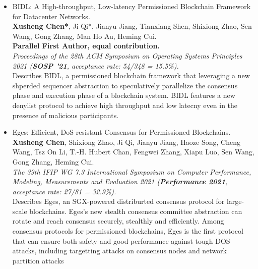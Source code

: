 \documentclass[a4paper,7pt]{article} %
\newcommand{\authors}[1]{{\small \fontfamily{cmss}\selectfont #1}}
\newcommand{\conference}[1]{\textit{\small \fontfamily{cmss}\selectfont #1}}
\newcommand{\info}[1]{{\footnotesize \fontfamily{cmss}\selectfont #1}}
\begin{document}
\begin{itemize}

    \item {BIDL: A High-throughput, Low-latency Permissioned Blockchain Framework for Datacenter Networks.} \\
    \authors{\textbf{Xusheng Chen*}, Ji Qi*, Jianyu Jiang, Tianxiang Shen, Shixiong Zhao, Sen Wang, Gong Zhang, Man Ho Au, Heming Cui.} \\
    \authors{\bf* Parallel First Author, equal contribution.}\\
    \conference{Proceedings of the 28th ACM Symposium on Operating Systems Principles 2021 (\textbf{SOSP '21}, acceptance rate: 54/348 = 15.5\%).} \\
    \info{Describes BIDL, a permissioned blockchain framework that leveraging a new shperded sequencer abstraction to speculatively parallelize the consensus phase and execution phase 
    of a blockchain system. BIDL features a new denylist protocol to achieve high throughput and low latecny even in the presence of 
    malicious participants.}\\

    \item {Eges: Efficient, DoS-resistant Consensus for Permissioned Blockchains.} \\
    \authors{\textbf{Xusheng Chen}, Shixiong Zhao, Ji Qi,  Jianyu Jiang, Haoze Song, Cheng Wang, Tsz On Li, T.-H. Hubert Chan, Fengwei Zhang, Xiapu Luo, Sen Wang, Gong Zhang, Heming Cui.} \\
    \conference{The 39th IFIP WG 7.3 International Symposium on Computer Performance, Modeling, Measurements and Evaluation 2021 ({\bf Performance 2021}, acceptance rate: 27/81 = 32.9\%).} \\
    \info{Describes Eges, an SGX-powered distriburted consensus protocol for large-scale blockchains. Eges's new stealth consensus committee abstraction can rotate and reach consensus securely, stealthly and efficiently. Among consensus protocols for permissioned blockchains, Eges is the first protocol that can ensure both safety and good performance against tough DOS attacks, including targetting attacks on consensus nodes and network partition attacks} \\



\end{itemize}
\end{document}
